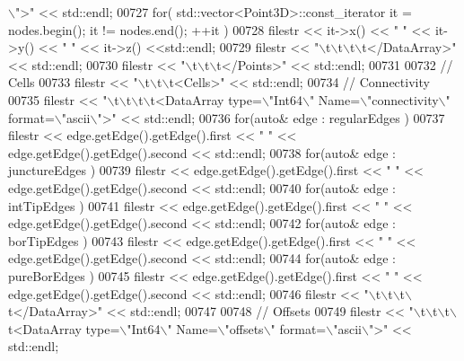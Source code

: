 \begin{DoxyCode}
{      \(\backslash\)">"} << std::endl;
00727     \textcolor{keywordflow}{for}( std::vector<Point3D>::const\_iterator it = nodes.begin(); it != nodes.end(); ++it )
00728         filestr << it->x() << \textcolor{stringliteral}{" "} << it->y() << \textcolor{stringliteral}{" "} << it->z() <<std::endl;
00729     filestr << \textcolor{stringliteral}{"\(\backslash\)t\(\backslash\)t\(\backslash\)t\(\backslash\)t</DataArray>"} << std::endl;
00730     filestr << \textcolor{stringliteral}{"\(\backslash\)t\(\backslash\)t\(\backslash\)t</Points>"} << std::endl;
00731 
00732     \textcolor{comment}{// Cells}
00733     filestr << \textcolor{stringliteral}{"\(\backslash\)t\(\backslash\)t\(\backslash\)t<Cells>"} << std::endl;
00734     \textcolor{comment}{//  Connectivity}
00735     filestr << \textcolor{stringliteral}{"\(\backslash\)t\(\backslash\)t\(\backslash\)t\(\backslash\)t<DataArray type=\(\backslash\)"Int64\(\backslash\)" Name=\(\backslash\)"connectivity\(\backslash\)" format=\(\backslash\)"ascii\(\backslash\)">"} << std::endl;
00736     \textcolor{keywordflow}{for}(\textcolor{keyword}{auto}& edge : regularEdges )
00737         filestr << edge.getEdge().getEdge().first << \textcolor{stringliteral}{" "} << edge.getEdge().getEdge().second << std::endl;
00738     \textcolor{keywordflow}{for}(\textcolor{keyword}{auto}& edge : junctureEdges )
00739         filestr << edge.getEdge().getEdge().first << \textcolor{stringliteral}{" "} << edge.getEdge().getEdge().second << std::endl;
00740     \textcolor{keywordflow}{for}(\textcolor{keyword}{auto}& edge : intTipEdges )
00741         filestr << edge.getEdge().getEdge().first << \textcolor{stringliteral}{" "} << edge.getEdge().getEdge().second << std::endl;
00742     \textcolor{keywordflow}{for}(\textcolor{keyword}{auto}& edge : borTipEdges )
00743         filestr << edge.getEdge().getEdge().first << \textcolor{stringliteral}{" "} << edge.getEdge().getEdge().second << std::endl;
00744     \textcolor{keywordflow}{for}(\textcolor{keyword}{auto}& edge : pureBorEdges )
00745         filestr << edge.getEdge().getEdge().first << \textcolor{stringliteral}{" "} << edge.getEdge().getEdge().second << std::endl;
00746     filestr << \textcolor{stringliteral}{"\(\backslash\)t\(\backslash\)t\(\backslash\)t\(\backslash\)t</DataArray>"} << std::endl;
00747 
00748     \textcolor{comment}{//  Offsets}
00749     filestr << \textcolor{stringliteral}{"\(\backslash\)t\(\backslash\)t\(\backslash\)t\(\backslash\)t<DataArray type=\(\backslash\)"Int64\(\backslash\)" Name=\(\backslash\)"offsets\(\backslash\)" format=\(\backslash\)"ascii\(\backslash\)">"} << std::endl;

\end{DoxyCode}
